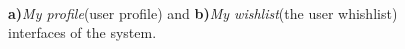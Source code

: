 \begin{figure}[ht!]
   \captionsetup{font=footnotesize}
   \centering
   \hspace{0.1\linewidth}
   \\[20pt]
   \caption{\textbf{a)}\textit{My profile}(user profile) and \textbf{b)}\textit{My wishlist}(the user whishlist) interfaces of the system.
   }
   \label{fig:wishlist} 
\end{figure}

